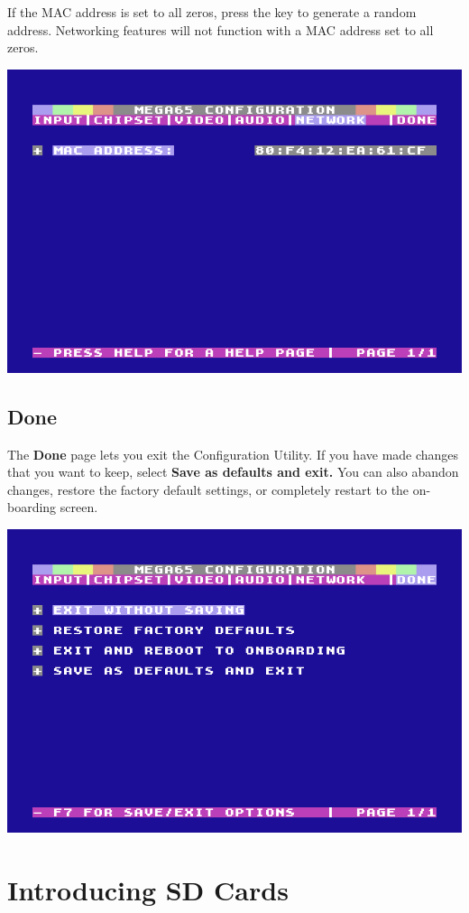 If the MAC address is set to all zeros, press the  key to generate a random address. Networking features will not function with a MAC address set to all zeros.

\begin{center}
  \includegraphics[width=0.7\linewidth]{images/ss-m65config-5.png}
\end{center}

\subsection{Done}

The {\bf Done} page lets you exit the Configuration Utility. If you have made changes that you want to keep, select {\bf Save as defaults and exit.} You can also abandon changes, restore the factory default settings, or completely restart to the on-boarding screen.

\begin{center}
  \includegraphics[width=0.7\linewidth]{images/ss-m65config-save.png}
\end{center}


\newpage
\section{Introducing SD Cards}
\label{sec:introducing-sd-cards}

